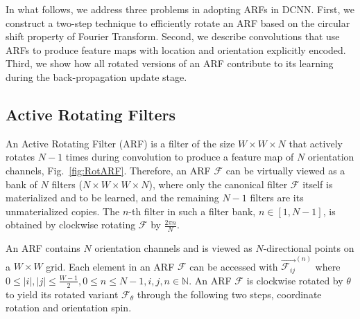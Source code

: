 \documentclass[10pt,twocolumn,letterpaper]{article}
\begin{document}
    In what follows, we address three problems in adopting ARFs in DCNN.
    First, we construct a two-step technique to efficiently rotate an ARF based on the circular shift property of Fourier Transform.
    Second, we describe convolutions that use ARFs to produce feature maps with location and orientation explicitly encoded.
    Third, we show how all rotated versions of an ARF contribute to its learning during the back-propagation update stage.


\subsection{Active Rotating Filters}
\label{sec:ARF}
    An Active Rotating Filter (ARF) is a filter of the size $W \times W \times N$ that actively rotates $N-1$ times during convolution to produce a feature map of $N$ orientation channels, Fig.~\ref{fig:RotARF}.
    Therefore, an ARF $\mathcal{F}$ can be virtually viewed as a bank of $N$ filters ($N \times W \times W \times N$), where only the canonical filter $\mathcal{F}$ itself is materialized and to be learned, and the remaining $N-1$ filters are its unmaterialized copies. The $n$-th filter in such {a} filter bank, $n \in [1, N-1]$, is obtained by clockwise rotating $\mathcal{F}$ by $\frac{2\pi n}{N}$.

    An ARF contains $N$ orientation channels and is viewed as $N$-directional points on a $W \times W$ grid. Each element in an ARF $\mathcal{F}$ can be accessed with $\overrightarrow{\mathcal{F}_{ij}}^{(n)}$ where $0 \leq |i|,|j| \leq \frac{W-1}{2}, 0 \leq n \leq N-1, i,j,n \in \mathbb{N}$. An ARF $\mathcal{F}$ is clockwise rotated by $\theta$ to yield its rotated variant $\mathcal{F}_{\theta}$ through the following two steps, coordinate rotation and orientation spin.
\end{document}
